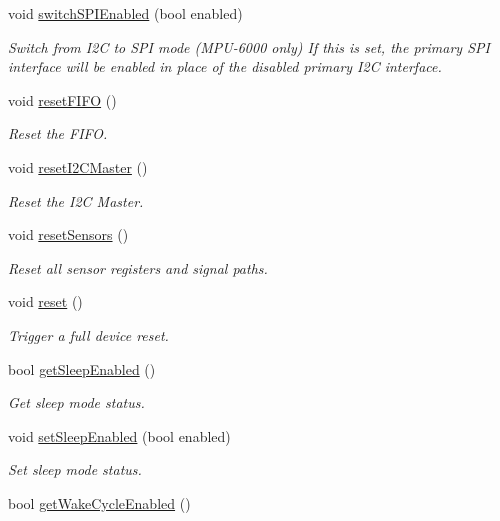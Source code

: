 \begin{DoxyCompactItemize}
void \mbox{\hyperlink{classMPU6050_a269710b7bca814bbf67e7bb38c381650}{switch\+S\+P\+I\+Enabled}} (bool enabled)
\begin{DoxyCompactList}\small\item\em Switch from I2C to S\+PI mode (M\+P\+U-\/6000 only) If this is set, the primary S\+PI interface will be enabled in place of the disabled primary I2C interface. \end{DoxyCompactList}\item 
void \mbox{\hyperlink{classMPU6050_aafa0dc38b7ea2acd1aecd5d9df8cbd08}{reset\+F\+I\+FO}} ()
\begin{DoxyCompactList}\small\item\em Reset the F\+I\+FO. \end{DoxyCompactList}\item 
void \mbox{\hyperlink{classMPU6050_a96332c394f1b7efd44c83a4ff690e732}{reset\+I2\+C\+Master}} ()
\begin{DoxyCompactList}\small\item\em Reset the I2C Master. \end{DoxyCompactList}\item 
void \mbox{\hyperlink{classMPU6050_a9a271104d3302abc4af005c69a930094}{reset\+Sensors}} ()
\begin{DoxyCompactList}\small\item\em Reset all sensor registers and signal paths. \end{DoxyCompactList}\item 
void \mbox{\hyperlink{classMPU6050_a7100b6d276c3c8664cf00d768b7b0dee}{reset}} ()
\begin{DoxyCompactList}\small\item\em Trigger a full device reset. \end{DoxyCompactList}\item 
bool \mbox{\hyperlink{classMPU6050_a196404ef04b959083d4bf5e6f1cd8b98}{get\+Sleep\+Enabled}} ()
\begin{DoxyCompactList}\small\item\em Get sleep mode status. \end{DoxyCompactList}\item 
void \mbox{\hyperlink{classMPU6050_a15ec5f8e7daf235f507c1d8b96af051a}{set\+Sleep\+Enabled}} (bool enabled)
\begin{DoxyCompactList}\small\item\em Set sleep mode status. \end{DoxyCompactList}\item 
bool \mbox{\hyperlink{classMPU6050_a89afc5235b9088c696e2cc7841f5259a}{get\+Wake\+Cycle\+Enabled}} ()

\end{DoxyCompactItemize}
